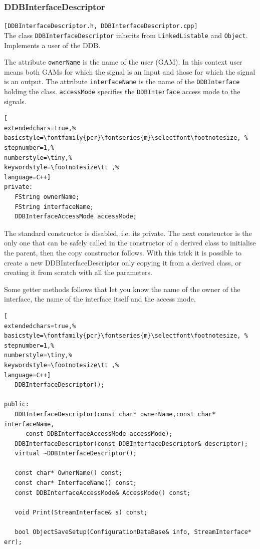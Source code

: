 \subsubsection{DDBInterfaceDescriptor}
\texttt{[DDBInterfaceDescriptor.h, DDBInterfaceDescriptor.cpp]}\\
The class \texttt{DDBInterfaceDescriptor} inherits from \texttt{LinkedListable} and \texttt{Object}. Implements a user of the DDB.

The attribute \texttt{ownerName} is the name of the user (GAM). In this context user means both GAMs for which the signal is an input and those for which the signal is an output. The attribute \texttt{interfaceName} is the name of the \texttt{DDBInterface} holding the class. \texttt{accessMode} specifies the \texttt{DDBInterface} access mode to the signals.

\begin{lstlisting}[
extendedchars=true,%
basicstyle=\fontfamily{pcr}\fontseries{m}\selectfont\footnotesize, %
stepnumber=1,%
numberstyle=\tiny,%
keywordstyle=\footnotesize\tt ,%
language=C++]
private:
   FString ownerName;
   FString interfaceName;
   DDBInterfaceAccessMode accessMode;
\end{lstlisting}

The standard constructor is disabled, i.e. its private. The next constructor is the only one that can be safely called in the constructor of a derived class to initialise the parent, then the copy constructor follows. With this trick it is possible to create a new DDBInterfaceDescriptor only copying it from a derived class, or creating it from scratch with all the parameters.

Some getter methods follows that let you know the name of the owner of the interface, the name of the interface itself and the access mode.
\begin{lstlisting}[
extendedchars=true,%
basicstyle=\fontfamily{pcr}\fontseries{m}\selectfont\footnotesize, %
stepnumber=1,%
numberstyle=\tiny,%
keywordstyle=\footnotesize\tt ,%
language=C++]
   DDBInterfaceDescriptor();

public:
   DDBInterfaceDescriptor(const char* ownerName,const char* interfaceName,
      const DDBInterfaceAccessMode accessMode);
   DDBInterfaceDescriptor(const DDBInterfaceDescriptor& descriptor);
   virtual ~DDBInterfaceDescriptor();

   const char* OwnerName() const;
   const char* InterfaceName() const;
   const DDBInterfaceAccessMode& AccessMode() const;

   void Print(StreamInterface& s) const;

   bool ObjectSaveSetup(ConfigurationDataBase& info, StreamInterface* err);
\end{lstlisting}



